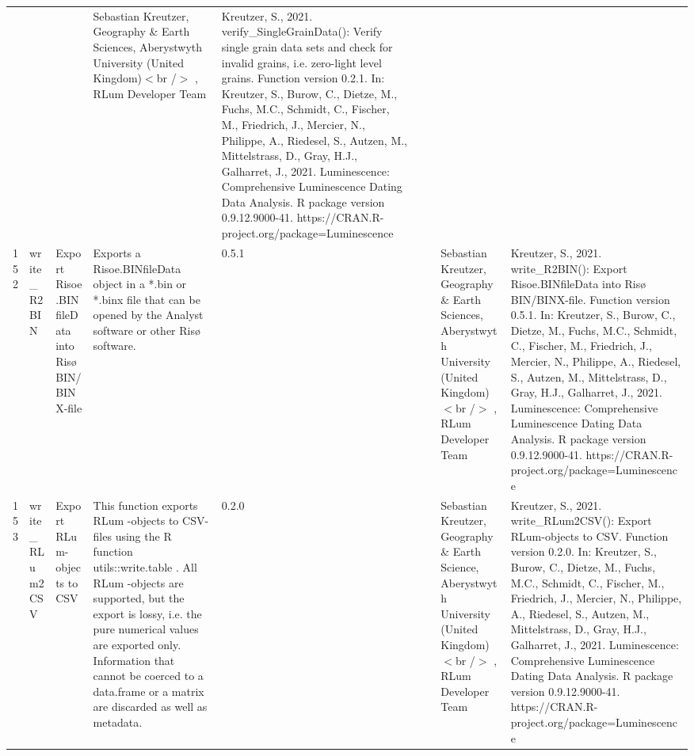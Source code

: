 \begin{table}[ht]
\begin{tabular}{rllllllll}
 &  &  & Sebastian Kreutzer, Geography \& Earth Sciences, Aberystwyth University (United Kingdom)$<$br /$>$ , RLum Developer Team & Kreutzer, S., 2021. verify\_SingleGrainData(): Verify single grain data sets and check for invalid grains, i.e. zero-light level grains. Function version 0.2.1. In: Kreutzer, S., Burow, C., Dietze, M., Fuchs, M.C., Schmidt, C., Fischer, M., Friedrich, J., Mercier, N., Philippe, A., Riedesel, S., Autzen, M., Mittelstrass, D., Gray, H.J., Galharret, J., 2021. Luminescence: Comprehensive Luminescence Dating Data Analysis. R package version 0.9.12.9000-41. https://CRAN.R-project.org/package=Luminescence
 \\ 
  152 & write\_R2BIN & Export Risoe.BINfileData into Risø BIN/BINX-file & Exports a Risoe.BINfileData object in a *.bin or *.binx file that can be opened by the Analyst software or other Risø software. & 0.5.1
 &  &  & Sebastian Kreutzer, Geography \& Earth Sciences, Aberystwyth University (United Kingdom)$<$br /$>$ , RLum Developer Team & Kreutzer, S., 2021. write\_R2BIN(): Export Risoe.BINfileData into Risø BIN/BINX-file. Function version 0.5.1. In: Kreutzer, S., Burow, C., Dietze, M., Fuchs, M.C., Schmidt, C., Fischer, M., Friedrich, J., Mercier, N., Philippe, A., Riedesel, S., Autzen, M., Mittelstrass, D., Gray, H.J., Galharret, J., 2021. Luminescence: Comprehensive Luminescence Dating Data Analysis. R package version 0.9.12.9000-41. https://CRAN.R-project.org/package=Luminescence
 \\ 
  153 & write\_RLum2CSV & Export RLum-objects to CSV & This function exports  RLum -objects to CSV-files using the R function utils::write.table . All  RLum -objects are supported, but the export is lossy, i.e. the pure numerical values are exported only. Information that cannot be coerced to a  data.frame  or a  matrix  are discarded as well as metadata. & 0.2.0
 &  &  & Sebastian Kreutzer, Geography \& Earth Science, Aberystwyth University (United Kingdom)$<$br /$>$ , RLum Developer Team & Kreutzer, S., 2021. write\_RLum2CSV(): Export RLum-objects to CSV. Function version 0.2.0. In: Kreutzer, S., Burow, C., Dietze, M., Fuchs, M.C., Schmidt, C., Fischer, M., Friedrich, J., Mercier, N., Philippe, A., Riedesel, S., Autzen, M., Mittelstrass, D., Gray, H.J., Galharret, J., 2021. Luminescence: Comprehensive Luminescence Dating Data Analysis. R package version 0.9.12.9000-41. https://CRAN.R-project.org/package=Luminescence
 \\ 
   \hline
\end{tabular}
\end{table}

